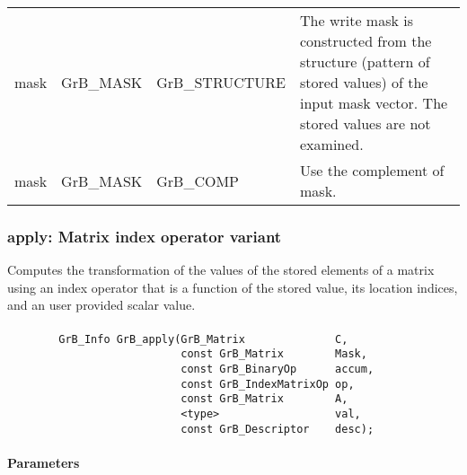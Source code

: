 \begin{itemize}[leftmargin=1.1in]
\begin{tabular}{lllp{2.7in}}
        {\sf mask} & {\sf GrB\_MASK} & {\sf GrB\_STRUCTURE}   & The write mask is
        constructed from the structure (pattern of stored values) of the input
        {\sf mask} vector. The stored values are not examined.\\

        {\sf mask} & {\sf GrB\_MASK} & {\sf GrB\_COMP}   & Use the 
        complement of {\sf mask}. \\
    \end{tabular}
\end{itemize}

\subsubsection{{\sf apply}: Matrix index operator variant}

Computes the transformation of the values of the stored elements of a matrix
using an index operator that is a function of the stored value, its location 
indices, and an user provided scalar value.

\paragraph{\syntax}

\begin{verbatim}
        GrB_Info GrB_apply(GrB_Matrix              C,
                           const GrB_Matrix        Mask,
                           const GrB_BinaryOp      accum,
                           const GrB_IndexMatrixOp op,
                           const GrB_Matrix        A,
                           <type>                  val,
                           const GrB_Descriptor    desc);
\end{verbatim}

\paragraph{Parameters}

